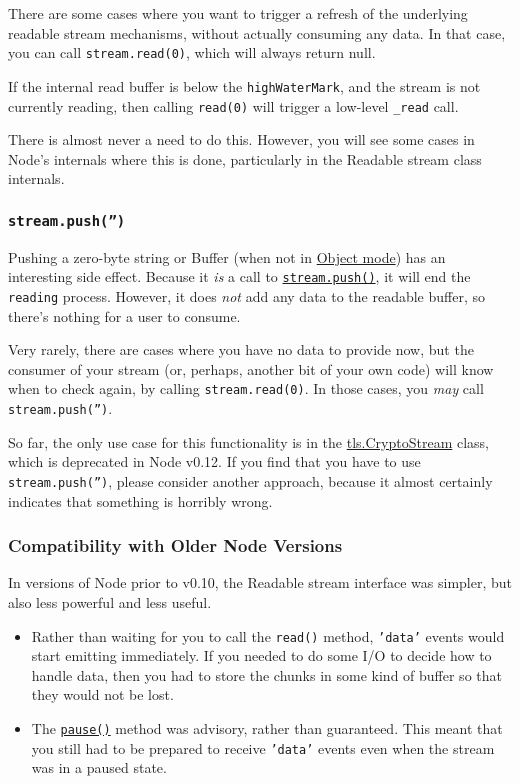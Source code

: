 There are some cases where you want to trigger a refresh of the
underlying readable stream mechanisms, without actually consuming any
data. In that case, you can call \texttt{stream.read(0)}, which will
always return null.

If the internal read buffer is below the \texttt{highWaterMark}, and the
stream is not currently reading, then calling \texttt{read(0)} will
trigger a low-level \texttt{\_read} call.

There is almost never a need to do this. However, you will see some
cases in Node's internals where this is done, particularly in the
Readable stream class internals.

\subsubsection{\texttt{stream.push('')}}\label{stream.push}

Pushing a zero-byte string or Buffer (when not in
\hyperref[streamux5fobjectux5fmode]{Object mode}) has an interesting
side effect. Because it \emph{is} a call to
\hyperref[streamux5freadableux5fpushux5fchunkux5fencoding]{\texttt{stream.push()}},
it will end the \texttt{reading} process. However, it does \emph{not}
add any data to the readable buffer, so there's nothing for a user to
consume.

Very rarely, there are cases where you have no data to provide now, but
the consumer of your stream (or, perhaps, another bit of your own code)
will know when to check again, by calling \texttt{stream.read(0)}. In
those cases, you \emph{may} call \texttt{stream.push('')}.

So far, the only use case for this functionality is in the
\href{tls.html\#tls_class_cryptostream}{tls.CryptoStream} class, which
is deprecated in Node v0.12. If you find that you have to use
\texttt{stream.push('')}, please consider another approach, because it
almost certainly indicates that something is horribly wrong.

\subsubsection{Compatibility with Older Node
Versions}\label{compatibility-with-older-node-versions}

In versions of Node prior to v0.10, the Readable stream interface was
simpler, but also less powerful and less useful.

\begin{itemize}
\itemsep1pt\parskip0pt
\item
  Rather than waiting for you to call the \texttt{read()} method,
  \texttt{'data'} events would start emitting immediately. If you needed
  to do some I/O to decide how to handle data, then you had to store the
  chunks in some kind of buffer so that they would not be lost.
\item
  The \hyperref[streamux5freadableux5fpause]{\texttt{pause()}} method
  was advisory, rather than guaranteed. This meant that you still had to
  be prepared to receive \texttt{'data'} events even when the stream was
  in a paused state.
\end{itemize}


